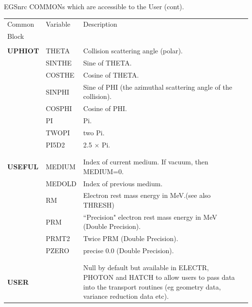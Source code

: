 \begin{table}[htb]
      
       

      
      
    

    \begin{center}
    EGSnrc COMMONs which are accessible to the User (cont).
    \begin{tabular}{ l  l   p{105mm}l  |}
    \hline
    Common & Variable & Description \\
    Block &&\\
    \hline
    &&\\
    {\bfseries UPHIOT}	&THETA	&Collision scattering angle (polar).\\
	&SINTHE	& Sine of THETA.\\
	&COSTHE & Cosine of THETA.\\
	&SINPHI	&Sine of PHI (the azimuthal
                            scattering angle of the collision).\\
	&COSPHI	& Cosine of PHI.\\
	&PI	& Pi.\\
	&TWOPI	& two Pi.\\
        &PI5D2  & 2.5 $\times$ Pi.\\
    &&\\
    \hline
    &&\\
    {\bfseries USEFUL}	&MEDIUM	&Index of current medium.  If
                            vacuum, then MEDIUM=0.\\
	&MEDOLD	&Index of previous medium.\\
	&RM	&Electron rest mass energy in MeV.(see also THRESH)\\
	&PRM	& ``Precision" electron rest mass
                            energy in MeV (Double Precision).\\
	&PRMT2	&Twice PRM (Double Precision).\\
	&PZERO	&precise 0.0 (Double Precision).\\
    &&\\
   \hline
    &&\\
    {\bfseries USER} & & Null by default but available in ELECTR, PHOTON
                     and HATCH to allow users to pass data into the
        transport routines (eg geometry data, variance reduction data
etc).\\

\end{tabular}
\end{center}
\end{table}
